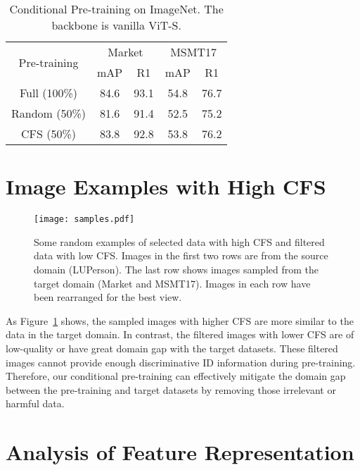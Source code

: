 \documentclass[10pt,twocolumn,letterpaper]{article}
\begin{document}
\begin{table}[htb]\begin{center}
\begin{tabular}{c|cc|cc}
        \hline
        \multirow{2}{*}{Pre-training} & \multicolumn{2}{c|}{Market}  & \multicolumn{2}{c}{MSMT17}\\
         & mAP & R1  & mAP & R1\\
        \hline
        Full (100\%)    &84.6 &93.1 &54.8 &76.7 \\
        Random (50\%)   &81.6 &91.4 &52.5 &75.2 \\
        CFS (50\%)      &83.8 &92.8 &53.8 &76.2 \\
        \hline
    \end{tabular}
    \end{center}
    \caption{\label{tab:apx1} Conditional Pre-training on ImageNet. The backbone is vanilla ViT-S. }
\end{table}

\section{Image Examples with High CFS}
\begin{figure}[htb]
    \centering
	\texttt{[image: samples.pdf]}
	\caption{Some random examples of selected data with high CFS and filtered data with low CFS. Images in the first two rows are from the source domain (LUPerson). The last row shows images sampled from the target domain (Market and MSMT17). Images in each row have been rearranged for the best view.} 
	\label{fig:samples}
	\vspace{-1em}
\end{figure}

As Figure~\ref{fig:samples} shows, the sampled images with higher CFS are more similar to the data in the target domain. In contrast, the filtered images with lower CFS are of low-quality or have great domain gap with the target datasets. These filtered images cannot provide enough discriminative ID information during pre-training. Therefore, our conditional pre-training can effectively mitigate the domain gap between the pre-training and target datasets by removing those irrelevant or harmful data.

\section{Analysis of Feature Representation}
\end{document}
